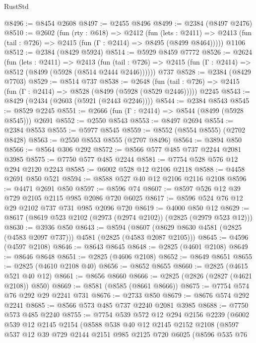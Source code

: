 \begin{lexlean}{RustStd}
\begin{coremodule}
@8496 := @8454 @2608
@8497 := @2455 @8496
@8499 := @2384 (@8497 @2476)
@8510 := @2602
    (fun (rty : @618) =>
    @2412
      (fun (lets : @2411) =>
      @2413 (fun (tail : @726) => @2415 (fun (Γ : @2414) => @8495 (@8499 @8464)))))
    @1106
@8512 := @2384 (@8429 @5924)
@8514 := @5929 @8459 @7772
@8526 := @2624
    (fun (lets : @2411) =>
    @2413
      (fun (tail : @726) => @2415 (fun (Γ : @2414) => @8512 (@8499 (@5928 (@8514 @2444 @2446))))))
    @737
@8528 := @2384 (@8429 @7703)
@8529 := @8514 @737
@8538 := @2648
    (fun (tail : @726) => @2415 (fun (Γ : @2414) => @8528 (@8499 (@5928 (@8529 @2446)))))
    @2245
@8543 := @8429 (@2434 (@2603 (@5921 (@2443 @2246))))
@8544 := @2384 @8543
@8545 := @8529 @2245
@8551 := @2666 (fun (Γ : @2414) => @8544 (@8499 (@5928 @8545))) @2691
@8552 := @2550 @8543
@8553 := @8497 @2694
@8554 := @2384 @8553
@8555 := @5977 @8545
@8559 := @8552 (@8554 @8555) (@2702 @8428)
@8563 := @2550 @8553 @8555 (@2707 @8496)
@8564 := @3894 @850
@8566 := @8564 @306 @292
@8572 := @8566 @577 @485 @737 @2244 @2081 @3985
@8575 := @7750 @577 @485 @2244
@8581 := @7754 @528 @576 @12 @294 @2120 @2243
@8585 := @6002 @528 @12 @2106 @2118
@8588 := @4458 @2691 @850 @521
@8594 := @8588 @527 @40 @12 @2106 @2116 @2108
@8596 := @4471 @2691 @850
@8597 := @8596 @74
@8607 := @8597 @526 @12 @39 @729 @2105 @2115 @985 @2086 @720 @6025
@8617 := @8596 @524 @76 @12 @29 @2102 @737 @731 @985 @2096 @720
@8619 := @4000 @850 @12
@8629 := @8617 (@8619 @523 @2102 (@2973 (@2974 @2102)) (@2825 (@2979 @523 @12)))
@8630 := @3936 @850
@8643 := @8594
    (@8607 (@8629 @8630 @4581 (@2825 (@4583 @2097 @737))) @4581 (@2825 (@4583 @2087 @2105)))
@8645 := @4596 (@4597 @2108)
@8646 := @8643 @8645
@8648 := @2825 (@4601 @2108)
@8649 := @8646 @8648
@8651 := @2825 (@4606 @2108)
@8652 := @8649 @8651
@8655 := @2825 (@4610 @2108 @40)
@8656 := @8652 @8655
@8660 := @2825 (@4615 @521 @40 @12)
@8661 := @8656 @8660
@8666 := @2825 (@2826 (@2827 (@4621 @2108)) @850)
@8669 := @8581 (@8585 (@8661 @8666))
@8675 := @7754 @574 @76 @292 @29 @2241 @731
@8676 := @2733 @850
@8679 := @8676 @574 @292 @2241
@8685 := @8566 @573 @485 @737 @2240 @2081 @3985
@8688 := @7750 @573 @485 @2240
@8755 := @7754
    @539
    @572
    @12
    @294
    @2156
    @2239
    (@6002
      @539
      @12
      @2145
      @2154
      (@8588
        @538
        @40
        @12
        @2145
        @2152
        @2108
        (@8597
          @537
          @12
          @39
          @729
          @2144
          @2151
          @985
          @2125
          @720
          @6025
          (@8596
            @535
            @76

\end{coremodule}
\end{lexlean}
